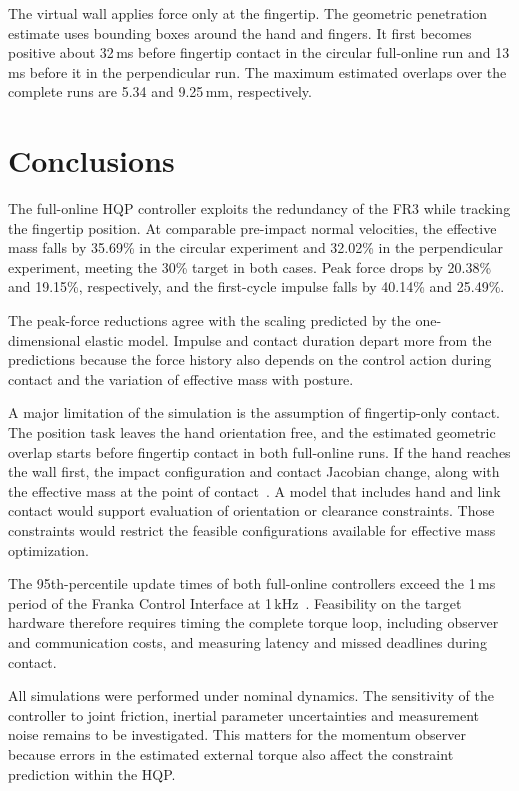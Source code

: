 \documentclass[12pt,a4paper]{article}
\begin{document}
The virtual wall applies force only at the fingertip. The geometric penetration
estimate uses bounding boxes around the hand and fingers. It first becomes positive
about 32\,ms before fingertip contact in the circular full-online run and 13\,ms
before it in the perpendicular run. The maximum estimated overlaps over the
complete runs are 5.34 and 9.25\,mm, respectively.

\clearpage
\section{Conclusions}
The full-online HQP controller exploits the redundancy of the FR3 while
tracking the fingertip position. At comparable pre-impact normal velocities,
the effective mass falls by 35.69\% in the circular experiment and 32.02\% in
the perpendicular experiment, meeting the 30\% target in both cases. Peak
force drops by 20.38\% and 19.15\%, respectively, and the first-cycle impulse
falls by 40.14\% and 25.49\%.

The peak-force reductions agree with the scaling predicted by the
one-dimensional elastic model. Impulse and contact duration depart more
from the predictions because the force history also depends on the control
action during contact and the variation of effective mass with posture.

A major limitation of the simulation is the assumption of fingertip-only contact.
The position task leaves the hand orientation free, and the estimated
geometric overlap starts before fingertip contact in both full-online runs.
If the hand reaches the wall first, the impact configuration and contact
Jacobian change, along with the effective mass at the point of
contact~\cite{haddadin2017}. A model that includes hand and link contact
would support evaluation of orientation or clearance constraints. Those
constraints would restrict the feasible configurations available for effective
mass optimization.

The 95th-percentile update times of both full-online controllers exceed
the 1\,ms period of the Franka Control Interface at 1\,kHz~\cite{franka-fci}.
Feasibility on the target hardware therefore requires timing the complete
torque loop, including observer and communication costs, and measuring
latency and missed deadlines during contact.

All simulations were performed under nominal dynamics. The sensitivity of
the controller to joint friction, inertial parameter uncertainties and
measurement noise remains to be investigated. This matters for the momentum
observer because errors in the estimated external torque also affect the
constraint prediction within the HQP.
\end{document}
